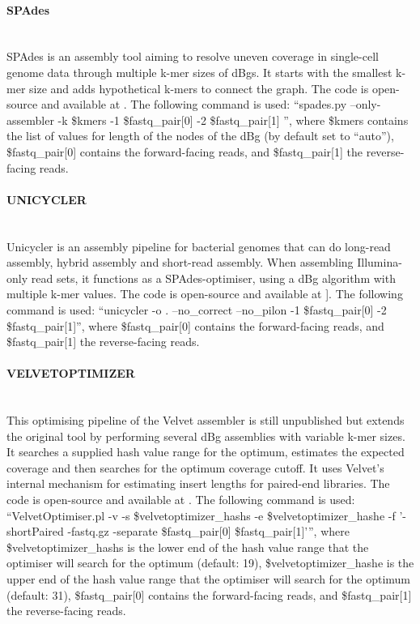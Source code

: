 \paragraph{SPAdes} \mbox{}\\

SPAdes \cite{bankevich_spades_2012} is an assembly tool aiming to resolve uneven coverage in single-cell genome data through multiple k-mer sizes of dBgs. It starts with the smallest k-mer size and adds hypothetical k-mers to connect the graph. The code is open-source and available at \cite{noauthor_spades_nodate}. The following command is used:  “spades.py --only-assembler -k \$kmers -1 \$fastq\_pair[0] -2 \$fastq\_pair[1] ”, where \$kmers contains the list of values for length of the nodes of the dBg (by default set to “auto”), \$fastq\_pair[0] contains the forward-facing reads, and \$fastq\_pair[1] the reverse-facing reads.

\paragraph{UNICYCLER} \mbox{}\\

Unicycler \cite{wick_unicycler_2017} is an assembly pipeline for bacterial genomes that can do long-read assembly, hybrid assembly and short-read assembly. When assembling Illumina-only read sets, it functions as a SPAdes-optimiser, using a  dBg algorithm with multiple k-mer values. The code is open-source and available at \cite{wick_unicycler_2022}]. The following command is used: “unicycler -o . --no\_correct --no\_pilon -1 \$fastq\_pair[0] -2 \$fastq\_pair[1]”, where \$fastq\_pair[0] contains the forward-facing reads, and \$fastq\_pair[1] the reverse-facing reads.

\paragraph{VELVETOPTIMIZER} \mbox{}\\

This optimising pipeline of the Velvet assembler \cite{zerbino_velvet_2008} is still unpublished but extends the original tool by performing several dBg assemblies with variable k-mer sizes. It searches a supplied hash value range for the optimum, estimates the expected coverage and then searches for the optimum coverage cutoff. It uses Velvet’s internal mechanism for estimating insert lengths for paired-end libraries.  The code is open-source and available at \cite{seemann_velvetoptimiser_2021}. The following command is used: “VelvetOptimiser.pl -v -s \$velvetoptimizer\_hashs -e \$velvetoptimizer\_hashe -f '-shortPaired -fastq.gz -separate \$fastq\_pair[0] \$fastq\_pair[1]'”, where \$velvetoptimizer\_hashs is the lower end of the hash value range that the optimiser will search for the optimum (default: 19), \$velvetoptimizer\_hashe is the upper end of the hash value range that the optimiser will search for the optimum (default: 31), \$fastq\_pair[0] contains the forward-facing reads, and \$fastq\_pair[1] the reverse-facing reads.

